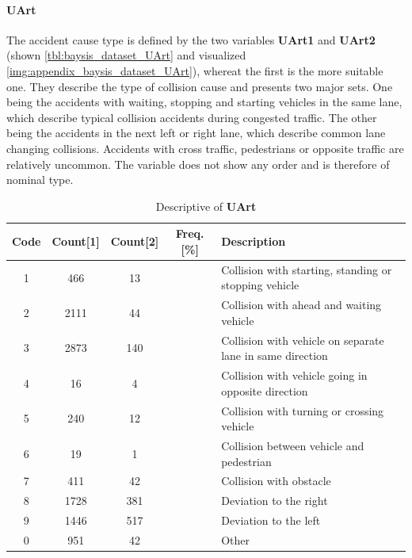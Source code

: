 \paragraph{UArt}
\label{baysis_dataset_UArt}
The accident cause type is defined by the two variables \textbf{UArt1} and \textbf{UArt2} (shown \autoref{tbl:baysis_dataset_UArt} and visualized \autoref{img:appendix_baysis_dataset_UArt}), whereat the first is the more suitable one. They describe the type of collision cause and presents two major sets. One being the accidents with waiting, stopping and starting vehicles in the same lane, which describe typical collision accidents during congested traffic. The other being the accidents in the next left or right lane, which describe common lane changing collisions. Accidents with cross traffic, pedestrians or opposite traffic are relatively uncommon. The variable does not show any order and is therefore of nominal type.
\begin{table}[ht]
	\centering
	\small
	\begin{tabular}{c|c|c|c|l} 
		\toprule
		Code & Count[1] & Count[2] & Freq. [\%] & Description \\ 
		\midrule
 		1 & 466		& 13	& & Collision with starting, standing or stopping vehicle  \\ 
 		2 & 2111	& 44 	& & Collision with ahead and waiting vehicle  \\
 		3 & 2873	& 140	& & Collision with vehicle on separate lane in same direction  \\
 		4 &	16		& 4		& & Collision with vehicle going in opposite direction  \\
 		5 & 240		& 12	& & Collision with turning or crossing vehicle  \\
 		6 & 19		& 1		& & Collision between vehicle and pedestrian  \\
 		7 & 411		& 42	& & Collision with obstacle  \\
 		8 & 1728	& 381	& & Deviation to the right  \\
 		9 & 1446	& 517	& & Deviation to the left  \\
		0 & 951		& 42	& & Other  \\
		\bottomrule
	\end{tabular}
	\caption{Descriptive of \textbf{UArt}}
	\label{tbl:baysis_dataset_UArt}
	\vspace{-8mm}
\end{table}

